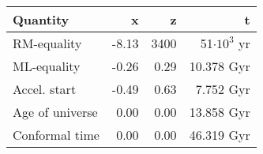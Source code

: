 \begin{tabular}{l|rrr}
Quantity & x & z & t  \\
\hline
RM-equality  & -8.13 & 3400 & 51$\cdot 10^3$ yr   \\
ML-equality  & -0.26 & 0.29 & 10.378  Gyr   \\
Accel. start  & -0.49 & 0.63 & 7.752 Gyr    \\
Age of universe  & 0.00 & 0.00 & 13.858 Gyr   \\
Conformal time  & 0.00 & 0.00 & 46.319 Gyr   \\
\hline
\hline
\end{tabular}
